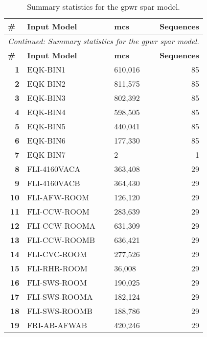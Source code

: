 \begin{longtable}{@{}rllr@{}}
\caption{Summary statistics for the \acrlong{gpwr} \acrshort{spar} model.}
\label{tab:generic_pwr_summary}\\
\toprule
\multicolumn{1}{l}{\textbf{\#}} & \textbf{Input Model} & \textbf{\acrlong{mcs}}               & \multicolumn{1}{r}{\textbf{Sequences}} \\* \midrule
\endfirsthead
\multicolumn{4}{c}{\textit{Continued: Summary statistics for the \acrlong{gpwr} \acrshort{spar} model.}}\\
\toprule
\multicolumn{1}{l}{\textbf{\#}} & \textbf{Input Model} & \textbf{\acrlong{mcs}}               & \multicolumn{1}{r}{\textbf{Sequences}} \\* \midrule
\endhead
%
\bottomrule
\endfoot
%
\endlastfoot
%
\textbf{1}  & EQK-BIN1         & 610,016   & 85 \\
\textbf{2}  & EQK-BIN2         & 811,575   & 85 \\
\textbf{3}  & EQK-BIN3         & 802,392   & 85 \\
\textbf{4}  & EQK-BIN4         & 598,505   & 85 \\
\textbf{5}  & EQK-BIN5         & 440,041   & 85 \\
\textbf{6}  & EQK-BIN6         & 177,330   & 85 \\
\textbf{7}  & EQK-BIN7         & 2         & 1  \\
\textbf{8}  & FLI-4160VACA     & 363,408   & 29 \\
\textbf{9}  & FLI-4160VACB     & 364,430   & 29 \\
\textbf{10} & FLI-AFW-ROOM     & 126,120   & 29 \\
\textbf{11} & FLI-CCW-ROOM     & 283,639   & 29 \\
\textbf{12} & FLI-CCW-ROOMA    & 631,309   & 29 \\
\textbf{13} & FLI-CCW-ROOMB    & 636,421   & 29 \\
\textbf{14} & FLI-CVC-ROOM     & 277,526   & 29 \\
\textbf{15} & FLI-RHR-ROOM     & 36,008    & 29 \\
\textbf{16} & FLI-SWS-ROOM     & 190,025   & 29 \\
\textbf{17} & FLI-SWS-ROOMA    & 182,124   & 29 \\
\textbf{18} & FLI-SWS-ROOMB    & 188,786   & 29 \\
\textbf{19} & FRI-AB-AFWAB     & 420,246   & 29 \\

\end{longtable}
